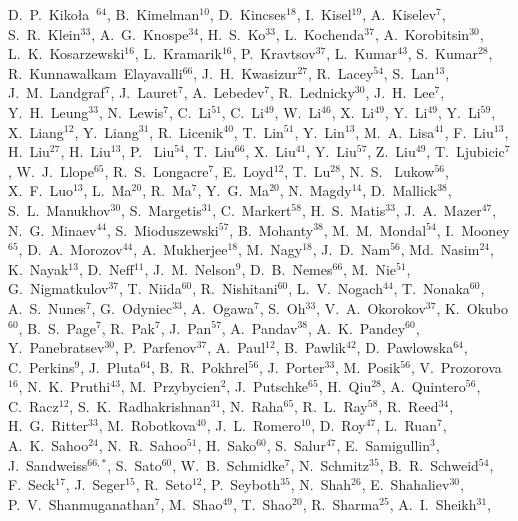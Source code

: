 {D.~P.~Kiko\l{}a~$^{64}$,
B.~Kimelman$^{10}$,
D.~Kincses$^{18}$,
I.~Kisel$^{19}$,
A.~Kiselev$^{7}$,
S.~R.~Klein$^{33}$,
A.~G.~Knospe$^{34}$,
H.~S.~Ko$^{33}$,
L.~Kochenda$^{37}$,
A.~Korobitsin$^{30}$,
L.~K.~Kosarzewski$^{16}$,
L.~Kramarik$^{16}$,
P.~Kravtsov$^{37}$,
L.~Kumar$^{43}$,
S.~Kumar$^{28}$,
R.~Kunnawalkam~Elayavalli$^{66}$,
J.~H.~Kwasizur$^{27}$,
R.~Lacey$^{54}$,
S.~Lan$^{13}$,
J.~M.~Landgraf$^{7}$,
J.~Lauret$^{7}$,
A.~Lebedev$^{7}$,
R.~Lednicky$^{30}$,
J.~H.~Lee$^{7}$,
Y.~H.~Leung$^{33}$,
N.~Lewis$^{7}$,
C.~Li$^{51}$,
C.~Li$^{49}$,
W.~Li$^{46}$,
X.~Li$^{49}$,
Y.~Li$^{49}$,
Y.~Li$^{59}$,
X.~Liang$^{12}$,
Y.~Liang$^{31}$,
R.~Licenik$^{40}$,
T.~Lin$^{51}$,
Y.~Lin$^{13}$,
M.~A.~Lisa$^{41}$,
F.~Liu$^{13}$,
H.~Liu$^{27}$,
H.~Liu$^{13}$,
P.~ Liu$^{54}$,
T.~Liu$^{66}$,
X.~Liu$^{41}$,
Y.~Liu$^{57}$,
Z.~Liu$^{49}$,
T.~Ljubicic$^{7}$,
W.~J.~Llope$^{65}$,
R.~S.~Longacre$^{7}$,
E.~Loyd$^{12}$,
T.~Lu$^{28}$,
N.~S.~ Lukow$^{56}$,
X.~F.~Luo$^{13}$,
L.~Ma$^{20}$,
R.~Ma$^{7}$,
Y.~G.~Ma$^{20}$,
N.~Magdy$^{14}$,
D.~Mallick$^{38}$,
S.~L.~Manukhov$^{30}$,
S.~Margetis$^{31}$,
C.~Markert$^{58}$,
H.~S.~Matis$^{33}$,
J.~A.~Mazer$^{47}$,
N.~G.~Minaev$^{44}$,
S.~Mioduszewski$^{57}$,
B.~Mohanty$^{38}$,
M.~M.~Mondal$^{54}$,
I.~Mooney$^{65}$,
D.~A.~Morozov$^{44}$,
A.~Mukherjee$^{18}$,
M.~Nagy$^{18}$,
J.~D.~Nam$^{56}$,
Md.~Nasim$^{24}$,
K.~Nayak$^{13}$,
D.~Neff$^{11}$,
J.~M.~Nelson$^{9}$,
D.~B.~Nemes$^{66}$,
M.~Nie$^{51}$,
G.~Nigmatkulov$^{37}$,
T.~Niida$^{60}$,
R.~Nishitani$^{60}$,
L.~V.~Nogach$^{44}$,
T.~Nonaka$^{60}$,
A.~S.~Nunes$^{7}$,
G.~Odyniec$^{33}$,
A.~Ogawa$^{7}$,
S.~Oh$^{33}$,
V.~A.~Okorokov$^{37}$,
K.~Okubo$^{60}$,
B.~S.~Page$^{7}$,
R.~Pak$^{7}$,
J.~Pan$^{57}$,
A.~Pandav$^{38}$,
A.~K.~Pandey$^{60}$,
Y.~Panebratsev$^{30}$,
P.~Parfenov$^{37}$,
A.~Paul$^{12}$,
B.~Pawlik$^{42}$,
D.~Pawlowska$^{64}$,
C.~Perkins$^{9}$,
J.~Pluta$^{64}$,
B.~R.~Pokhrel$^{56}$,
J.~Porter$^{33}$,
M.~Posik$^{56}$,
V.~Prozorova$^{16}$,
N.~K.~Pruthi$^{43}$,
M.~Przybycien$^{2}$,
J.~Putschke$^{65}$,
H.~Qiu$^{28}$,
A.~Quintero$^{56}$,
C.~Racz$^{12}$,
S.~K.~Radhakrishnan$^{31}$,
N.~Raha$^{65}$,
R.~L.~Ray$^{58}$,
R.~Reed$^{34}$,
H.~G.~Ritter$^{33}$,
M.~Robotkova$^{40}$,
J.~L.~Romero$^{10}$,
D.~Roy$^{47}$,
L.~Ruan$^{7}$,
A.~K.~Sahoo$^{24}$,
N.~R.~Sahoo$^{51}$,
H.~Sako$^{60}$,
S.~Salur$^{47}$,
E.~Samigullin$^{3}$,
J.~Sandweiss$^{66,*}$,
S.~Sato$^{60}$,
W.~B.~Schmidke$^{7}$,
N.~Schmitz$^{35}$,
B.~R.~Schweid$^{54}$,
F.~Seck$^{17}$,
J.~Seger$^{15}$,
R.~Seto$^{12}$,
P.~Seyboth$^{35}$,
N.~Shah$^{26}$,
E.~Shahaliev$^{30}$,
P.~V.~Shanmuganathan$^{7}$,
M.~Shao$^{49}$,
T.~Shao$^{20}$,
R.~Sharma$^{25}$,
A.~I.~Sheikh$^{31}$,
}
